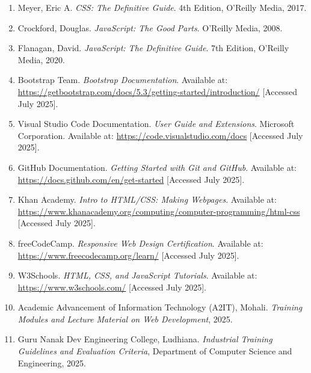\documentclass[a4paper,12pt,oneside]{report}
\numberwithin{equation}{chapter}
\numberwithin{figure}{chapter}
\numberwithin{table}{chapter}
\begin{document}
\begin{enumerate}
    \item Meyer, Eric A. \textit{CSS: The Definitive Guide}. 4th Edition, O’Reilly Media, 2017.

    \item Crockford, Douglas. \textit{JavaScript: The Good Parts}. O’Reilly Media, 2008.

    \item Flanagan, David. \textit{JavaScript: The Definitive Guide}. 7th Edition, O’Reilly Media, 2020.

    \item Bootstrap Team. \textit{Bootstrap Documentation}. Available at: \url{https://getbootstrap.com/docs/5.3/getting-started/introduction/} [Accessed July 2025].

    \item Visual Studio Code Documentation. \textit{User Guide and Extensions}. Microsoft Corporation. Available at: \url{https://code.visualstudio.com/docs} [Accessed July 2025].

    \item GitHub Documentation. \textit{Getting Started with Git and GitHub}. Available at: \url{https://docs.github.com/en/get-started} [Accessed July 2025].

    \item Khan Academy. \textit{Intro to HTML/CSS: Making Webpages}. Available at: \url{https://www.khanacademy.org/computing/computer-programming/html-css} [Accessed July 2025].

    \item freeCodeCamp. \textit{Responsive Web Design Certification}. Available at: \url{https://www.freecodecamp.org/learn/} [Accessed July 2025].

    \item W3Schools. \textit{HTML, CSS, and JavaScript Tutorials}. Available at: \url{https://www.w3schools.com/} [Accessed July 2025].

    \item Academic Advancement of Information Technology (A2IT), Mohali. \textit{Training Modules and Lecture Material on Web Development}, 2025.

    \item Guru Nanak Dev Engineering College, Ludhiana. \textit{Industrial Training Guidelines and Evaluation Criteria}, Department of Computer Science and Engineering, 2025.
\end{enumerate}

\appendix
\end{document}
